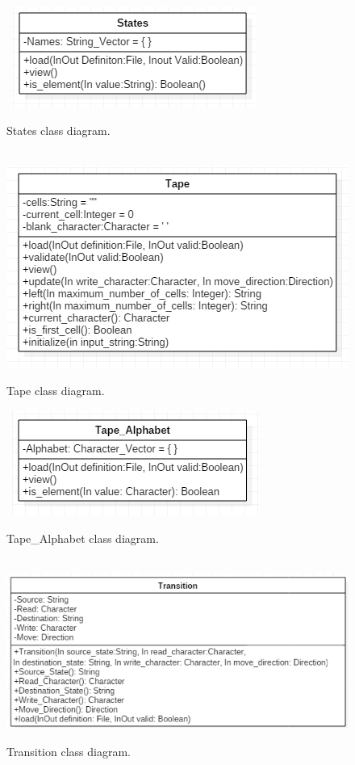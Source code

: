 \documentclass{report}
\begin{document}
\begin{figure}[!ht]
  	\centering
	\
    \includegraphics[scale=0.90]{States.png}
  \caption{States class diagram.}
\end{figure}

\begin{figure}[!ht]
  	\centering
	\
    \includegraphics[scale=0.90]{Tape.png}
  \caption{Tape class diagram.}
\end{figure}

\begin{figure}[!ht]
  	\centering
	\
    \includegraphics[scale=0.90]{Tape_Alphabet.png}
  \caption{Tape\_Alphabet class diagram.}
\end{figure}

\begin{figure}[!ht]
  	\centering
	\
    \includegraphics[scale=0.90]{Transition_v2.png}
  \caption{Transition class diagram.}
\end{figure}
\end{document}
